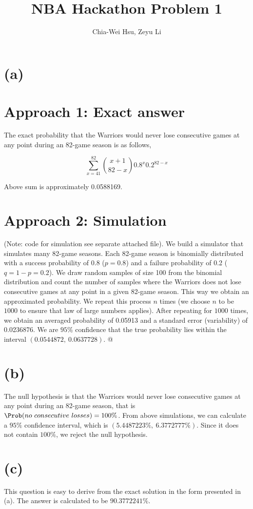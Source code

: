 \documentclass{article}\usepackage[]{graphicx}\usepackage[]{color}
\begin{document}
\title{NBA Hackathon Problem 1}
\author{Chia-Wei Hsu, Zeyu Li}
\maketitle

\section*{(a)}
\section*{Approach 1: Exact answer}

    
The exact probability that the Warriors would never lose consecutive games at any
point during an 82-game season is as follows, 

\begin{equation*}
    \sum_{x = 41}^{82}\binom{x+1}{82-x}0.8^x0.2^{82-x}
\end{equation*}

Above sum is approximately 0.0588169.

\section*{Approach 2: Simulation}



(Note: code for simulation see separate attached file). We build a simulator
that simulates many 82-game seasons. Each 82-game season is binomially
distributed with a success probability of 0.8 ($p = 0.8$) and a failure
probability of 0.2 ($q = 1 - p = 0.2$). We draw random samples of size 100 from
the binomial distribution and count the number of samples where the Warriors
does not lose consecutive games at any point in a given 82-game season. This way
we obtain an approximated probability. We repeat this process $n$ times (we
choose $n$ to be $1000$ to ensure that law of large numbers applies). After
repeating for $1000$ times, we obtain an averaged probability of 0.05913 and a
standard error (variability) of 0.0236876. We are $95\%$ confidence that the
true probability lies within the interval $(0.0544872, \ 0.0637728)$.
@

\section*{(b)}
The null hypothesis is that the Warriors would never lose consecutive games at
any point during an 82-game season, that is $\Prob(no\ consecutive\ losses) =
100\%$. From above simulations, we can calculate a $95\%$ confidence interval,
which is $(5.4487223\%, \ 6.3772777\%)$. Since it does not contain
$100\%$, we reject the null hypothesis. 


\section*{(c)}
This question is easy to derive from the exact solution in the form presented in
(a). The answer is calculated to be $90.3772241\%$.
\end{document}

